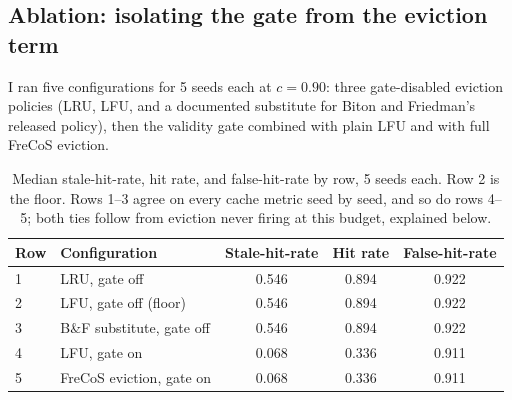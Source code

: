 \documentclass[10pt]{article}
\begin{document}
\subsection{Ablation: isolating the gate from the eviction term}
\label{sec:ablation}

I ran five configurations for 5 seeds each at $c=0.90$: three gate-disabled eviction policies
(LRU, LFU, and a documented substitute for Biton and Friedman's released policy), then the
validity gate combined with plain LFU and with full FreCoS eviction.

\begin{table}[H]
\centering
\caption{Median stale-hit-rate, hit rate, and false-hit-rate by row, 5 seeds each. Row 2
is the floor. Rows 1--3 agree on every cache metric seed by seed, and so do rows 4--5; both
ties follow from eviction never firing at this budget, explained below.}
\label{tab:ablation}
\footnotesize
\begin{tabular}{llccc}
\toprule
Row & Configuration & Stale-hit-rate & Hit rate & False-hit-rate \\
\midrule
1 & LRU, gate off & 0.546 & 0.894 & 0.922 \\
2 & LFU, gate off (floor) & 0.546 & 0.894 & 0.922 \\
3 & B\&F substitute, gate off & 0.546 & 0.894 & 0.922 \\
4 & LFU, gate on & 0.068 & 0.336 & 0.911 \\
5 & FreCoS eviction, gate on & 0.068 & 0.336 & 0.911 \\
\bottomrule
\end{tabular}
\end{table}
\end{document}
